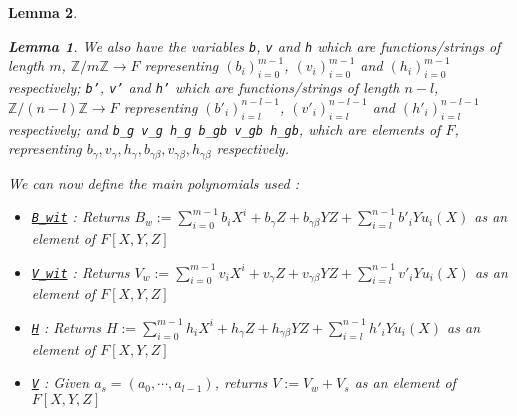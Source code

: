 \documentclass{article}
\newtheorem{lemma}{Lemma}
\theoremstyle{definition}
\theoremstyle{remark}
\begin{document}
\begin{lemma}
\begin{lemma}
We also have the variables \texttt{b}, \texttt{v} and \texttt{h} which are functions/strings of length $m$, $\mathbb{Z}/m \mathbb{Z} \to F$ representing $(b_i)_{i = 0}^{m - 1}$, $(v_i)_{i = 0}^{m - 1}$ and $(h_i)_{i = 0}^{m - 1}$ respectively; 
\texttt{b'}, \texttt{v'} and \texttt{h'} which are functions/strings of length $n - l$, $\mathbb{Z}/(n - l) \mathbb{Z} \to F$ representing $(b'_i)_{i = l}^{n - l - 1}$, $(v'_i)_{i = l}^{n - l - 1}$ and $(h'_i)_{i = l}^{n - l - 1}$ respectively; and 
\texttt{b\_g v\_g h\_g b\_gb v\_gb h\_gb}, which are elements of $F$, representing $b_{\gamma}, v_{\gamma}, h_{\gamma}, b_{\gamma \beta}, v_{\gamma \beta}, h_{\gamma \beta}$ respectively.

We can now define the main polynomials used :
\begin{itemize}
  \item \href{https://github.com/BoltonBailey/formal-snarks-project/blob/7fd9cd122f5887f88f6a706b4f2a68a7153c7381/src/snarks/babysnark/knowledge_soundness.lean#L177}{\texttt{B\_wit}} : Returns $B_w := \sum_{i = 0}^{m - 1} b_i X^i + b_{\gamma}Z + b_{\gamma \beta}YZ + \sum_{i = l}^{n - 1} b'_{i} Y u_{i}(X)$ as an element of $F[X, Y, Z]$
  \item \href{https://github.com/BoltonBailey/formal-snarks-project/blob/7fd9cd122f5887f88f6a706b4f2a68a7153c7381/src/snarks/babysnark/knowledge_soundness.lean#L186}{\texttt{V\_wit}} : Returns $V_w := \sum_{i = 0}^{m - 1} v_i X^i + v_{\gamma}Z + v_{\gamma \beta}YZ + \sum_{i = l}^{n - 1} v'_{i} Y u_{i}(X)$ as an element of $F[X, Y, Z]$
  \item \href{https://github.com/BoltonBailey/formal-snarks-project/blob/7fd9cd122f5887f88f6a706b4f2a68a7153c7381/src/snarks/babysnark/knowledge_soundness.lean#L195}{\texttt{H}} : Returns $H := \sum_{i = 0}^{m - 1} h_i X^i + h_{\gamma}Z + h_{\gamma \beta}YZ + \sum_{i = l}^{n - 1} h'_{i} Y u_{i}(X)$ as an element of $F[X, Y, Z]$
  \item \href{https://github.com/BoltonBailey/formal-snarks-project/blob/7fd9cd122f5887f88f6a706b4f2a68a7153c7381/src/snarks/babysnark/knowledge_soundness.lean#L206}{\texttt{V}} : Given $a_s = (a_0, \cdots, a_{l - 1})$, returns $V := V_w + V_s$ as an element of $F[X, Y, Z]$
\end{itemize}


\end{lemma}
\end{lemma}
\end{document}
